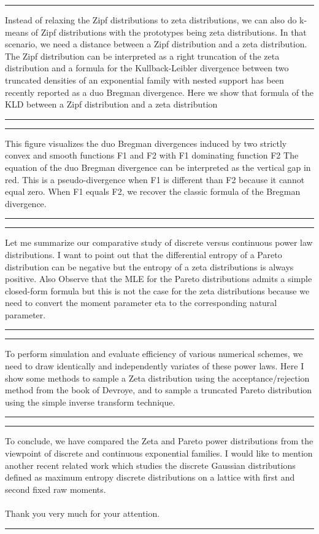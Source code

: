 \documentclass{article}
\def\slide#1{
\noindent\hrule
\begin{center}
\begin{minipage}{0.8\textwidth}
#1
\end{minipage}
\end{center}
\noindent\hrule
}
\begin{document}
\slide{
Instead of relaxing the Zipf distributions to zeta distributions, we can also do k-means of Zipf distributions with the prototypes being zeta distributions.
In that scenario, we need a distance between a Zipf distribution and a zeta distribution. The Zipf distribution can be interpreted as a right truncation of the zeta distribution and a formula for the Kullback-Leibler divergence between two truncated densities of an exponential family with nested support has been recently reported as a duo Bregman divergence. Here we show that formula of the KLD between a Zipf distribution and a zeta distribution
}





\slide{
This figure visualizes the duo Bregman divergences induced by two strictly convex and smooth functions F1 and F2 with F1 dominating function F2
The equation of the duo Bregman divergence can be interpreted as the vertical gap in red.
This is a pseudo-divergence when F1 is different than F2 because it cannot equal zero. 
When F1 equals F2, we recover the classic formula of the Bregman divergence.
}











\slide{
Let me summarize our comparative study of discrete versus continuous power law distributions.
I want to point out that the differential entropy of a Pareto distribution can be negative but the entropy of a zeta distributions is always positive.
Also Observe that the MLE for the Pareto distributions admits a simple closed-form formula but this is not the
case for the zeta distributions because we need to convert the moment parameter eta to the corresponding natural parameter.
}








\slide{
To perform simulation and evaluate efficiency of various numerical schemes, we need to draw identically and independently variates of these power laws.
Here I show some methods to sample a Zeta distribution using the acceptance/rejection method from the book of Devroye, and to sample a truncated Pareto distribution using the simple inverse transform technique.
}













\slide{
To conclude, we have compared the Zeta and Pareto power distributions from the viewpoint of discrete and continuous exponential families.
I would like to mention another recent related work which studies the discrete Gaussian distributions defined as maximum entropy discrete distributions on a lattice with first and second fixed raw moments.\\
\ \\
Thank you very much for your attention.
}



\end{document}
